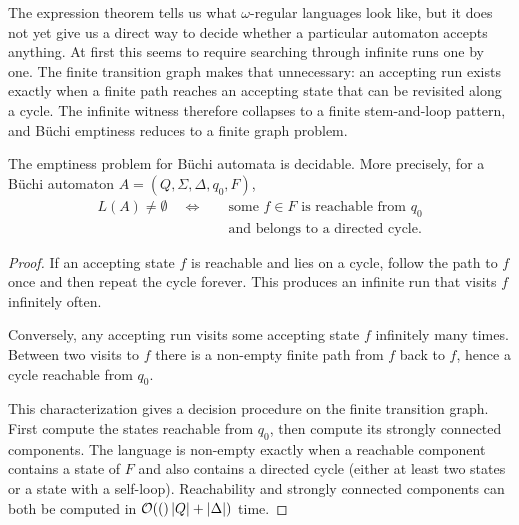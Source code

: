 The expression theorem tells us what $\omega$-regular languages look
like, but it does not yet give us a direct way to decide whether a
particular automaton accepts anything.  At first this seems to require
searching through infinite runs one by one.  The finite transition graph
makes that unnecessary: an accepting run exists exactly when a finite
path reaches an accepting state that can be revisited along a cycle.  The
infinite witness therefore collapses to a finite stem-and-loop pattern,
and B\"uchi emptiness reduces to a finite graph problem.

\begin{theorem}
\label{thm:buchi-emptiness}
The emptiness problem for B\"uchi automata is decidable.  More precisely,
for a B\"uchi automaton $A=(Q,\Sigma,\Delta,q_0,F)$,
\[
  \begin{aligned}
    L(A)\neq\emptyset
    \quad\Longleftrightarrow\quad&
    \text{some }f\in F\text{ is reachable from }q_0\\
    &\text{and belongs to a directed cycle.}
  \end{aligned}
\]
\end{theorem}

\begin{proof}
If an accepting state $f$ is reachable and lies on a cycle, follow the
path to $f$ once and then repeat the cycle forever.  This produces an
infinite run that visits $f$ infinitely often.

Conversely, any accepting run visits some accepting state $f$ infinitely
many times.  Between two visits to $f$ there is a non-empty finite path
from $f$ back to $f$, hence a cycle reachable from $q_0$.

This characterization gives a decision procedure on the finite transition
graph.  First compute the states reachable from $q_0$, then compute its
strongly connected components.  The language is non-empty exactly when a
reachable component contains a state of $F$ and also contains a directed
cycle (either at least two states or a state with a self-loop).  Reachability
and strongly connected components can both be computed in
$\mathcal{O}\!\left((\right)|Q|+|\Delta|)$ time.
\end{proof}


